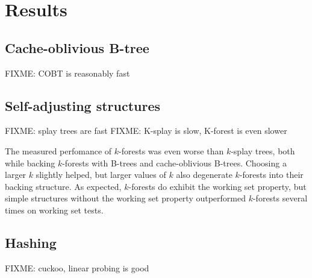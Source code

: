 \chapter{Results}
\label{chapter:results}

\section{Cache-oblivious B-tree}
FIXME: COBT is reasonably fast

\section{Self-adjusting structures}
FIXME: splay trees are fast
FIXME: K-splay is slow, K-forest is even slower

The measured perfomance of $k$-forests was even worse than $k$-splay trees,
both while backing $k$-forests with B-trees and cache-oblivious B-trees.
Choosing a larger $k$ slightly helped, but larger values of $k$ also degenerate
$k$-forests into their backing structure. As expected, $k$-forests do exhibit
the working set property, but simple structures without the working set property
outperformed $k$-forests several times on working set tests.

\section{Hashing}
FIXME: cuckoo, linear probing is good
